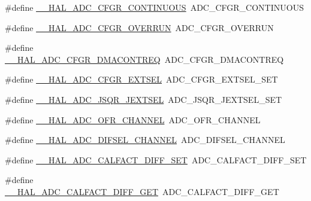\begin{DoxyCompactItemize}
\item 
\#define \hyperlink{group___h_a_l___a_d_c___aliased___macros_gab45f96be007a67f1251d47410b5c9618}{\+\_\+\+\_\+\+H\+A\+L\+\_\+\+A\+D\+C\+\_\+\+C\+F\+G\+R\+\_\+\+C\+O\+N\+T\+I\+N\+U\+O\+US}~A\+D\+C\+\_\+\+C\+F\+G\+R\+\_\+\+C\+O\+N\+T\+I\+N\+U\+O\+US
\item 
\#define \hyperlink{group___h_a_l___a_d_c___aliased___macros_ga4312a4ed4373cdd0302434574aa0c8c9}{\+\_\+\+\_\+\+H\+A\+L\+\_\+\+A\+D\+C\+\_\+\+C\+F\+G\+R\+\_\+\+O\+V\+E\+R\+R\+UN}~A\+D\+C\+\_\+\+C\+F\+G\+R\+\_\+\+O\+V\+E\+R\+R\+UN
\item 
\#define \hyperlink{group___h_a_l___a_d_c___aliased___macros_gaa80ebf8b334aa3e040d153ec06c880e2}{\+\_\+\+\_\+\+H\+A\+L\+\_\+\+A\+D\+C\+\_\+\+C\+F\+G\+R\+\_\+\+D\+M\+A\+C\+O\+N\+T\+R\+EQ}~A\+D\+C\+\_\+\+C\+F\+G\+R\+\_\+\+D\+M\+A\+C\+O\+N\+T\+R\+EQ
\item 
\#define \hyperlink{group___h_a_l___a_d_c___aliased___macros_gacc58e207b5fcc238afb480a00997d167}{\+\_\+\+\_\+\+H\+A\+L\+\_\+\+A\+D\+C\+\_\+\+C\+F\+G\+R\+\_\+\+E\+X\+T\+S\+EL}~A\+D\+C\+\_\+\+C\+F\+G\+R\+\_\+\+E\+X\+T\+S\+E\+L\+\_\+\+S\+ET
\item 
\#define \hyperlink{group___h_a_l___a_d_c___aliased___macros_ga362667abab4da4e626e45c9aef345d85}{\+\_\+\+\_\+\+H\+A\+L\+\_\+\+A\+D\+C\+\_\+\+J\+S\+Q\+R\+\_\+\+J\+E\+X\+T\+S\+EL}~A\+D\+C\+\_\+\+J\+S\+Q\+R\+\_\+\+J\+E\+X\+T\+S\+E\+L\+\_\+\+S\+ET
\item 
\#define \hyperlink{group___h_a_l___a_d_c___aliased___macros_gad3ba77f5090921040fa9a63ff8d31241}{\+\_\+\+\_\+\+H\+A\+L\+\_\+\+A\+D\+C\+\_\+\+O\+F\+R\+\_\+\+C\+H\+A\+N\+N\+EL}~A\+D\+C\+\_\+\+O\+F\+R\+\_\+\+C\+H\+A\+N\+N\+EL
\item 
\#define \hyperlink{group___h_a_l___a_d_c___aliased___macros_ga697c5bcf01d90462bf0c65c1434204a2}{\+\_\+\+\_\+\+H\+A\+L\+\_\+\+A\+D\+C\+\_\+\+D\+I\+F\+S\+E\+L\+\_\+\+C\+H\+A\+N\+N\+EL}~A\+D\+C\+\_\+\+D\+I\+F\+S\+E\+L\+\_\+\+C\+H\+A\+N\+N\+EL
\item 
\#define \hyperlink{group___h_a_l___a_d_c___aliased___macros_ga0d6a948351847da8e821fd673cd5395c}{\+\_\+\+\_\+\+H\+A\+L\+\_\+\+A\+D\+C\+\_\+\+C\+A\+L\+F\+A\+C\+T\+\_\+\+D\+I\+F\+F\+\_\+\+S\+ET}~A\+D\+C\+\_\+\+C\+A\+L\+F\+A\+C\+T\+\_\+\+D\+I\+F\+F\+\_\+\+S\+ET
\item 
\#define \hyperlink{group___h_a_l___a_d_c___aliased___macros_ga04d8142122bd9275a1219043edc63d98}{\+\_\+\+\_\+\+H\+A\+L\+\_\+\+A\+D\+C\+\_\+\+C\+A\+L\+F\+A\+C\+T\+\_\+\+D\+I\+F\+F\+\_\+\+G\+ET}~A\+D\+C\+\_\+\+C\+A\+L\+F\+A\+C\+T\+\_\+\+D\+I\+F\+F\+\_\+\+G\+ET

\end{DoxyCompactItemize}
